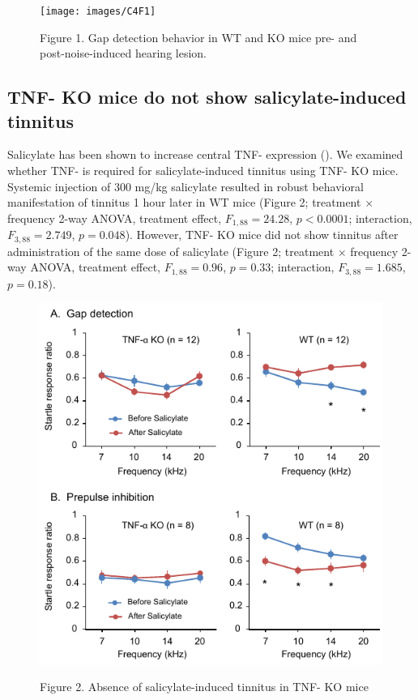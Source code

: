 \begin{figure}[h]
	\centering
		\texttt{[image: images/C4F1]}
	\begin{changemargin}{1in}{1in}
	\footnotesize{Figure 1. Gap detection behavior in WT and KO mice pre- and post-noise-induced hearing lesion.}
	\end{changemargin}
\end{figure}

\subsection{TNF-\textalpha{} KO mice do not show salicylate-induced tinnitus}

Salicylate has been shown to increase central TNF-\textalpha{} expression (\cite{Hwang2011}). We examined whether TNF-\textalpha{} is required for salicylate-induced tinnitus using TNF-\textalpha{} KO mice. Systemic injection of 300 mg/kg salicylate resulted in robust behavioral manifestation of tinnitus 1 hour later in WT mice (Figure 2; treatment $\times$ frequency 2-way ANOVA, treatment effect, $F_{1,88}=24.28$, $p<0.0001$; interaction, $F_{3,88}=2.749$, $p=0.048$). However, TNF-\textalpha{} KO mice did not show tinnitus after administration of the same dose of salicylate (Figure 2; treatment $\times$ frequency 2-way ANOVA, treatment effect, $F_{1,88}=0.96$, $p=0.33$; interaction, $F_{3,88}=1.685$, $p=0.18$).

\begin{figure}[h]
	\centering
		\includegraphics[width=4.5in]{images/C4F2}
	\begin{changemargin}{1in}{1in}
	\footnotesize{Figure 2. Absence of salicylate-induced tinnitus in TNF-\textalpha{} KO mice}
	\end{changemargin}
\end{figure}


